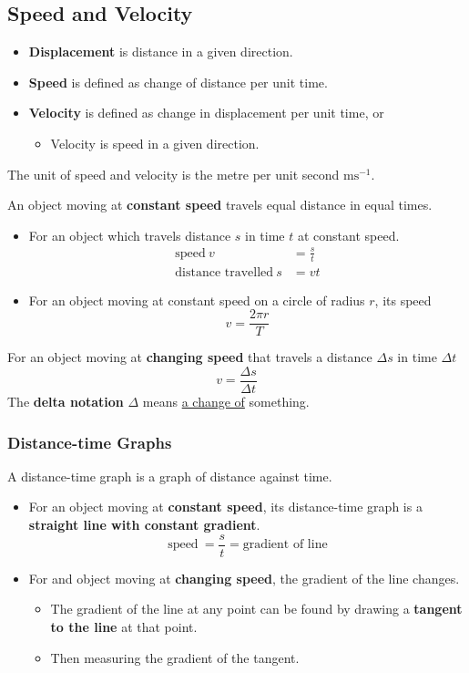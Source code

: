 \subsection{Speed and Velocity}
\begin{itemize}
    \item \textbf{Displacement} is distance in a given direction.
    \item \textbf{Speed} is defined as change of distance per unit time.
    \item \textbf{Velocity} is defined as change in displacement per unit time, or
        \begin{itemize}
            \item Velocity is speed in a given direction.
        \end{itemize}
\end{itemize}

The unit of speed and velocity is the metre per unit second $\text{ms}^{-1}$.

An object moving at \textbf{constant speed} travels equal distance in equal times.
\begin{itemize}
    \item For an object which travels distance $s$ in time $t$ at constant speed.
        \begin{align*}
            \text{speed}\ v&=\frac{s}{t}\\
            \text{distance travelled}\ s&=vt
        \end{align*}
    \item For an object moving at  constant speed on a circle of radius $r$, its speed
        $$v=\frac{2\pi r}{T}$$
\end{itemize}

For an object moving at \textbf{changing speed} that travels a distance $\Delta s$ in time $\Delta t$
$$v=\frac{\Delta s}{\Delta t}$$
The \textbf{delta notation} $\Delta$ means \underline{a change of} something.

\subsubsection*{Distance-time Graphs}

A distance-time graph is a graph of distance against time.

\begin{itemize}
    \item For an object moving at \textbf{constant speed}, its distance-time graph is a \textbf{straight line with constant gradient}.
    $$\text{speed}\ =\frac{s}{t}=\text{gradient of line}$$
    \item For and object moving at \textbf{changing speed}, the gradient of the line changes.
        \begin{itemize}
            \item The gradient of the line at any point can be found by drawing a \textbf{tangent to the line} at that point.
            \item Then measuring the gradient of the tangent.
        \end{itemize}
\end{itemize}

